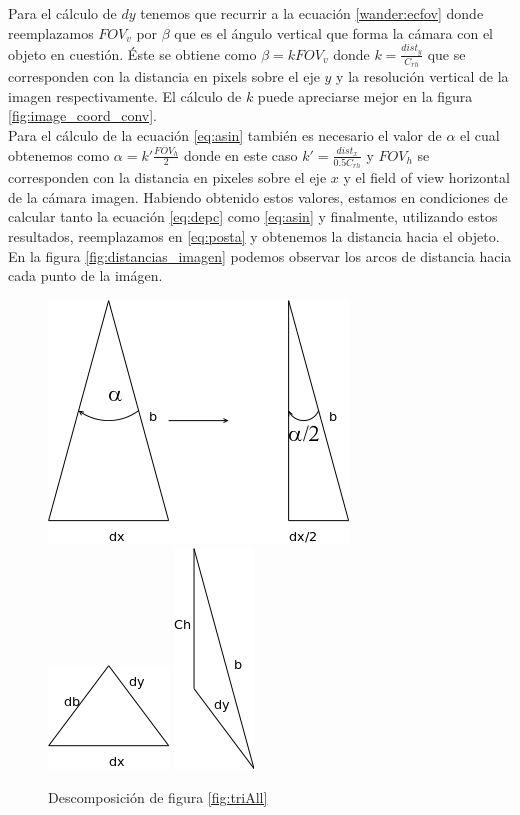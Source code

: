 Para el c\'alculo de $dy$ tenemos que recurrir a la ecuaci\'on 
\ref{wander:ecfov} donde reemplazamos $FOV_v$ por $\beta$ que es el \'angulo
vertical que forma la c\'amara con el objeto en cuesti\'on. \'Este se obtiene
como $\beta=k FOV_v$ donde $k=\frac{dist_y}{C_{rh}}$ que se corresponden con la
distancia en pixels sobre el eje $y$ y la resoluci\'on vertical de la imagen
respectivamente. El c\'alculo de $k$ puede apreciarse mejor en la figura
\ref{fig:image_coord_conv}.
\\ Para el c\'alculo de la ecuaci\'on \ref{eq:asin}
tambi\'en es necesario el valor de $\alpha$ el cual obtenemos como
$\alpha=k'\frac{FOV_h}{2}$ donde en este caso $k'=\frac{dist_x}{0.5C_{rh}}$
y $FOV_h$ se corresponden con la distancia en pixeles sobre el eje $x$ y
el field of view horizontal de la c\'amara imagen. Habiendo obtenido estos
valores, estamos en condiciones de calcular
tanto la ecuaci\'on \ref{eq:depc} como \ref{eq:asin} y finalmente, utilizando
estos resultados, reemplazamos en \ref{eq:posta} y obtenemos la distancia
hacia el objeto. En la figura \ref{fig:distancias_imagen} podemos observar
los arcos de distancia hacia cada punto de la im\'agen. 

\begin{figure}[htp]
\begin{center}
\includegraphics[scale=0.5]{comportamientos/figures/trianglesAB.png}
\includegraphics[scale=0.5]{comportamientos/figures/trianglesRDA.png}
\includegraphics[scale=0.5]{comportamientos/figures/trianglesChBD.png}
\caption[Descomposici\'on de figura \ref{fig:triAll}]
		{Descomposici\'on de figura \ref{fig:triAll}}
\label{fig:trianglesAB}
\end{center}
\end{figure}

